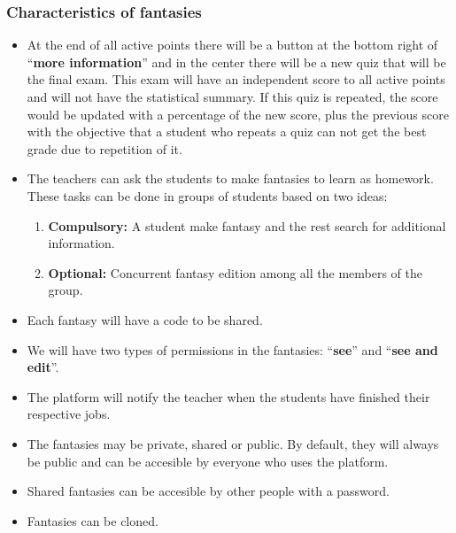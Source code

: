 \subsubsection{Characteristics of fantasies}
\begin{itemize}
	\item At the end of all active points there will be a button at the bottom right of ``\textbf{more information}'' and in the center there will be a new quiz that will be the final exam. This exam will have an independent score to all active points and will not have the statistical summary. If this quiz is repeated, the score would be updated with a percentage of the new score, plus the previous score with the objective that a student who repeats a quiz can not get the best grade due to repetition of it.
	\item The teachers can ask the students to make fantasies to learn as homework. These tasks can be done in groups of students based on two ideas:
	\begin{enumerate}
		\item \textbf{Compulsory:} A student make fantasy and the rest search for additional information.
		\item \textbf{Optional:} Concurrent fantasy edition among all the members of the group.
	\end{enumerate}
	\item Each fantasy will have a code to be shared.
	\item We will have two types of permissions in the fantasies: ``\textbf{see}'' and ``\textbf{see and edit}''.
	\item The platform will notify the teacher when the students have finished their respective jobs.
	\item The fantasies may be private, shared or public. By default, they will always be public and can be accesible by everyone who uses the platform.
	\item Shared fantasies can be accesible by other people with a password.
	\item Fantasies can be cloned.
\end{itemize}

